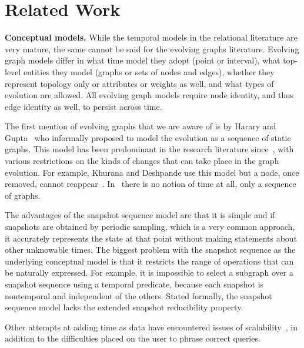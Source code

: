 \section{Related Work}
\label{sec:related}

{\bf Conceptual models.}  While the temporal models in the relational
literature are very mature, the same cannot be said for the evolving
graphs literature.  Evolving graph models differ in what time model
they adopt (point or interval), what top-level entities they model
(graphs or sets of nodes and edges), whether they represent topology
only or attributes or weights as well, and what types of evolution are
allowed.  All evolving graph models require node identity, and thus
edge identity as well, to persist across time.

The first mention of evolving graphs that we are aware of is by Harary
and Gupta~\cite{Harary1997} who informally proposed to model the
evolution as a sequence of static graphs.  This model has been predominant in the
research literature
since~\cite{Ferreira2004,Kan2009,Khurana2013,Lerman2010,Ren2011,Semertzidis2015},
with various restrictions on the kinds of changes that can take place
in the graph evolution.  For example, Khurana and Deshpande use this
model but a node, once removed, cannot reappear~\cite{Khurana2013}.
In~\cite{Labouseur2015,Ren2011} there is no notion of time at all,
only a sequence of graphs.  

The advantages of the snapshot sequence model are that it is simple
and if snapshots are obtained by periodic sampling, which is a very
common approach, it accurately represents the state at that point
without making statements about other unknowable times.  The biggest
problem with the snapshot sequence as the underlying conceptual model
is that it restricts the range of operations that can be naturally
expressed.  For example, it is impossible to select a subgraph over a
snapshot sequence using a temporal predicate, because each snapshot is
nontemporal and independent of the others.  Stated formally, the
snapshot sequence model lacks the extended snapshot reducibility
property.

Other attempts at adding time as data have encountered issues of
scalability~\cite{Cattuto2013}, in addition to the difficulties placed
on the user to phrase correct queries.

